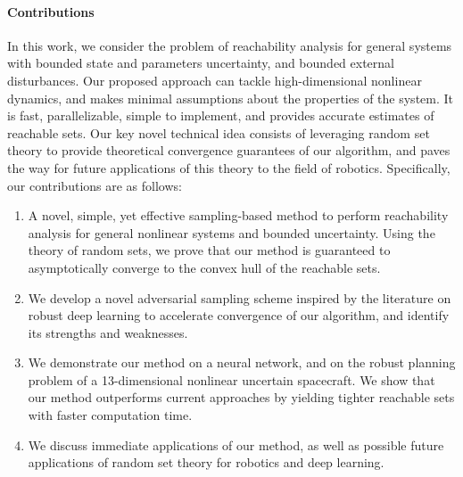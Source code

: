 \documentclass{article}
\begin{document}
\vspace{-2mm}\paragraph{Contributions} In this work, we consider the problem of reachability analysis for general systems with bounded state and parameters uncertainty, and bounded external disturbances. Our proposed approach can tackle high-dimensional nonlinear dynamics, and makes minimal assumptions about the properties of the system. It is fast, parallelizable, simple to implement, and provides accurate estimates of reachable sets. Our key novel technical idea consists of leveraging random set theory to provide theoretical convergence guarantees of our algorithm, and paves the way for future applications of this theory to the field of robotics. Specifically, our contributions are as follows: 
\begin{enumerate}[leftmargin=6mm]
    \item A novel, simple, yet effective sampling-based method to perform reachability analysis for general nonlinear systems and bounded uncertainty. Using the theory of random sets, we prove that our method is guaranteed to asymptotically converge to the convex hull of the reachable sets.

    \item We develop a novel adversarial sampling scheme inspired by the literature on robust deep learning to accelerate convergence of our algorithm, and identify its strengths and weaknesses.

    \item We demonstrate our method on a neural network, and on the robust planning problem of a 13-dimensional nonlinear uncertain spacecraft. We show that our method outperforms current approaches by yielding tighter reachable sets with faster computation time. 

    \item We discuss immediate applications of our method, as well as possible future applications of random set theory for robotics and deep learning.
\end{enumerate}

\end{document}
